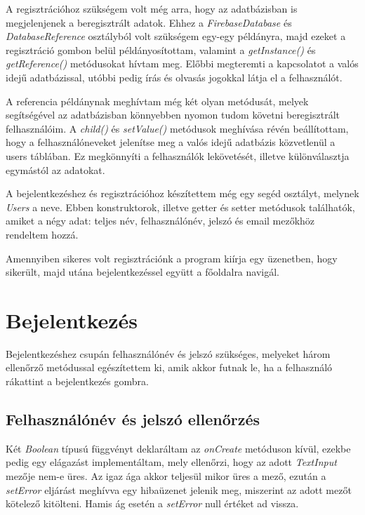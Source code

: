 \documentclass{thesis-ekf}
\begin{document}
A regisztrációhoz szükségem volt még arra, hogy az adatbázisban is megjelenjenek a beregisztrált adatok. Ehhez a \textit{FirebaseDatabase} és \textit{DatabaseReference} osztályból volt szükségem egy-egy példányra, majd ezeket a regisztráció gombon belül példányosítottam, valamint a \textit{getInstance()} és \textit{getReference()} metódusokat hívtam meg. Előbbi megteremti a kapcsolatot a valós idejű adatbázissal, utóbbi pedig írás és olvasás jogokkal látja el a felhasználót. 

A referencia példánynak meghívtam még két olyan metódusát, melyek segítségével az adatbázisban könnyebben nyomon tudom követni beregisztrált felhasználóim. A \textit{child()} és \textit{setValue()} metódusok meghívása révén beállítottam, hogy a felhasználóneveket jelenítse meg a valós idejű adatbázis közvetlenül a users táblában. Ez megkönnyíti a felhasználók lekövetését, illetve különválasztja egymástól az adatokat.

A bejelentkezéshez és regisztrációhoz készítettem még egy segéd osztályt, melynek \textit{Users} a neve. Ebben konstruktorok, illetve getter és setter metódusok találhatók, amiket a négy adat: teljes név, felhasználónév, jelszó és email mezőkhöz rendeltem hozzá.

Amennyiben sikeres volt regisztrációnk a program kiírja egy üzenetben, hogy sikerült, majd utána bejelentkezéssel együtt a főoldalra navigál. 
\pagebreak
{}
\renewcommand{\lstlistingname}{kód}


\section{Bejelentkezés}
Bejelentkezéshez csupán felhasználónév és jelszó szükséges, melyeket három ellenőrző metódussal egészítettem ki, amik akkor futnak le, ha a felhasználó rákattint a bejelentkezés gombra. 

\subsection{Felhasználónév és jelszó ellenőrzés}
Két \textit{Boolean} típusú függvényt deklaráltam az \textit{onCreate} metóduson kívül, ezekbe pedig egy elágazást implementáltam, mely ellenőrzi, hogy az adott \textit{TextInput} mezője nem-e üres. Az igaz ága akkor teljesül mikor üres a mező, ezután a \textit{setError} eljárást meghívva egy hibaüzenet jelenik meg, miszerint az adott mezőt kötelező kitölteni. Hamis ág esetén a \textit{setError} null értéket ad vissza. 
\end{document}
